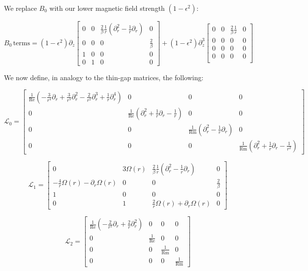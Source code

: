 \documentclass{paper}
\newcommand{\beq}{\begin{equation}}
\newcommand{\eeq}{\end{equation}}
\newcommand\reye{\mathrm{Re}}
\newcommand\reym{\mathrm{Rm}}
\begin{document}
We replace $B_0$ with our lower magnetic field strength $(1 - \epsilon^2)$:

\beq
B_0 \, \mathrm{terms} = 
(1 - \epsilon^2) \partial_z \left[\begin{matrix}
0 & 0 & \frac{2}{\beta} \frac{1}{r} \left(\partial_r^2 - \frac{1}{r}\partial_r\right) & 0 \\
0 & 0 & 0 & \frac{2}{\beta}\\
1 & 0 & 0 & 0\\
0 & 1 & 0 & 0
\end{matrix}\right] 
+
(1 - \epsilon^2) \partial_z^3 \left[\begin{matrix}
0 & 0 & \frac{2}{\beta} \frac{1}{r} & 0 \\
0 & 0 & 0 & 0 \\
0 & 0 & 0 & 0 \\
0 & 0 & 0 & 0 \\
\end{matrix}\right]
\eeq

We now define, in analogy to the thin-gap matrices, the following:

\beq
\mathcal{L}_0 = \left[\begin{matrix}
\frac{1}{\reye} \left(-\frac{3}{r^4} \partial_r + \frac{3}{r^3} \partial_r^2 - \frac{2}{r^2} \partial_r^3 + \frac{1}{r} \partial_r^4\right) & 0 & 0 & 0\\
0 & \frac{1}{\reye} \left(\partial_r^2 + \frac{1}{r} \partial_r - \frac{1}{r} \right) & 0 & 0 \\
0 & 0 & \frac{1}{\reym} \left(\partial_r^2 - \frac{1}{r} \partial_r\right) & 0 \\
0 & 0 & 0 & \frac{1}{\reym} \left(\partial_r^2 + \frac{1}{r}\partial_r - \frac{1}{r^2}\right)
\end{matrix}\right]
\eeq

\beq
\mathcal{L}_1 = \left[\begin{matrix}
0 & 3\Omega(r) & \frac{2}{\beta} \frac{1}{r} \left(\partial_r^2 - \frac{1}{r}\partial_r\right) & 0 \\
-\frac{4}{r} \Omega(r) - \partial_r \Omega(r) & 0 & 0 & \frac{2}{\beta} \\
1 & 0 & 0 & 0 \\
0 & 1 & \frac{2}{r} \Omega(r)  + \partial_r \Omega(r) & 0
\end{matrix}\right]
\eeq

\beq
\mathcal{L}_2 = \left[\begin{matrix}
\frac{1}{\reye}\left(-\frac{2}{r^2}\partial_r + \frac{2}{r}\partial_r^2\right) & 0 & 0 & 0 \\
0 & \frac{1}{\reye} & 0 & 0 \\
0 & 0 & \frac{1}{\reym} & 0 \\
0 & 0 & 0 & \frac{1}{\reym}
\end{matrix}\right]
\eeq
\end{document}
